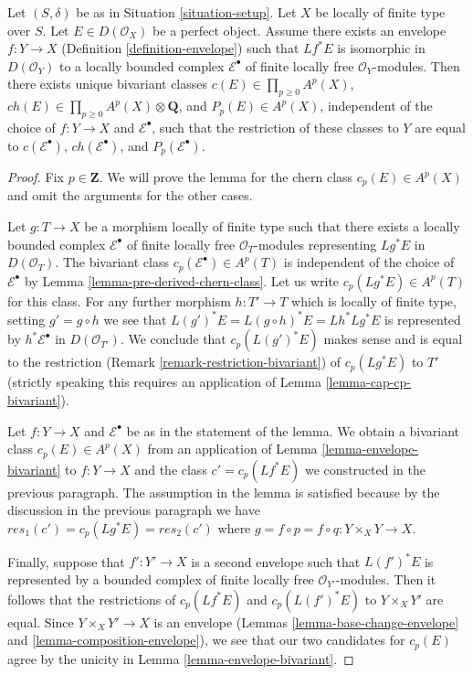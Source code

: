 \begin{lemma}
\label{lemma-defined-by-envelope}
Let $(S, \delta)$ be as in Situation \ref{situation-setup}.
Let $X$ be locally of finite type over $S$. Let $E \in D(\mathcal{O}_X)$
be a perfect object. Assume there exists an envelope
$f : Y \to X$ (Definition \ref{definition-envelope})
such that $Lf^*E$ is isomorphic in $D(\mathcal{O}_Y)$
to a locally bounded complex $\mathcal{E}^\bullet$ of finite locally free
$\mathcal{O}_Y$-modules. Then there exists unique bivariant classes
$c(E) \in \prod_{p \geq 0} A^p(X)$,
$ch(E) \in \prod_{p \geq 0} A^p(X) \otimes \mathbf{Q}$, and
$P_p(E) \in A^p(X)$, independent of the choice of $f : Y \to X$
and $\mathcal{E}^\bullet$, such that the restriction of these classes
to $Y$ are equal to $c(\mathcal{E}^\bullet)$,
$ch(\mathcal{E}^\bullet)$, and $P_p(\mathcal{E}^\bullet)$.
\end{lemma}

\begin{proof}
Fix $p \in \mathbf{Z}$. We will prove the lemma for the chern
class $c_p(E) \in A^p(X)$ and omit the arguments for the other cases.

\medskip\noindent
Let $g : T \to X$ be a morphism locally of finite type such that
there exists a locally bounded complex $\mathcal{E}^\bullet$ of finite locally
free $\mathcal{O}_T$-modules representing $Lg^*E$ in $D(\mathcal{O}_T)$.
The bivariant class $c_p(\mathcal{E}^\bullet) \in A^p(T)$
is independent of the choice of $\mathcal{E}^\bullet$ by
Lemma \ref{lemma-pre-derived-chern-class}.
Let us write $c_p(Lg^*E) \in A^p(T)$ for this class.
For any further morphism $h : T' \to T$ which is locally
of finite type, setting $g' = g \circ h$ we see that
$L(g')^*E = L(g \circ h)^*E = Lh^*Lg^*E$ is represented by
$h^*\mathcal{E}^\bullet$ in $D(\mathcal{O}_{T'})$.
We conclude that $c_p(L(g')^*E)$ makes sense and is equal to the
restriction (Remark \ref{remark-restriction-bivariant})
of $c_p(Lg^*E)$ to $T'$ (strictly speaking this requires an application of
Lemma \ref{lemma-cap-cp-bivariant}).

\medskip\noindent
Let $f : Y \to X$ and $\mathcal{E}^\bullet$ be as in the statement
of the lemma. We obtain a bivariant class $c_p(E) \in A^p(X)$ from
an application of Lemma \ref{lemma-envelope-bivariant}
to $f : Y \to X$ and the class $c' = c_p(Lf^*E)$ we constructed
in the previous paragraph. The assumption in the lemma is
satisfied because by the discussion in the previous paragraph we have
$res_1(c') = c_p(Lg^*E) = res_2(c')$ where
$g = f \circ p = f \circ q : Y \times_X Y \to X$.

\medskip\noindent
Finally, suppose that $f' : Y' \to X$ is a second envelope
such that $L(f')^*E$ is represented by a bounded complex of
finite locally free $\mathcal{O}_{Y'}$-modules. Then it follows
that the restrictions of $c_p(Lf^*E)$ and $c_p(L(f')^*E)$
to $Y \times_X Y'$ are equal. Since $Y \times_X Y' \to X$
is an envelope (Lemmas \ref{lemma-base-change-envelope} and
\ref{lemma-composition-envelope}), we see that our two candidates for $c_p(E)$
agree by the unicity in Lemma \ref{lemma-envelope-bivariant}.
\end{proof}

